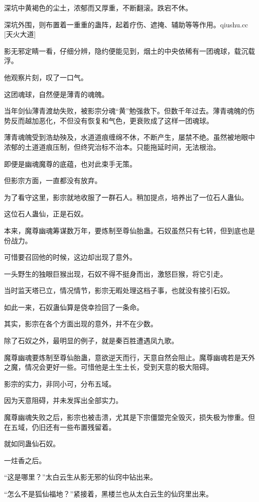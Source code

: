 \begin{this_body}
深坑中黄褐色的尘土，浓郁而又厚重，不断翻滚。跌宕不休。

深坑外围，则布置着一重重的蛊阵，起着疗伤、遮掩、辅助等等作用。qiushu.cc [天火大道]

影无邪定睛一看，仔细分辨，隐约便能见到，烟土的中央依稀有一团魂球，载沉载浮。

他观察片刻，叹了一口气。

这团魂球，自然便是薄青的魂魄。

当年剑仙薄青渡劫失败，被影宗分魂“黄”勉强救下。但数千年过去。薄青魂魄的伤势反而越加恶化，不但没有恢复和气色，更衰败成了这样一团魂球。

薄青魂魄受到浩劫殃及，水道道痕缠绵不休，不断产生，屡禁不绝。虽然被地眼中浓郁的土道道痕压制，但终究治标不治本。只能拖延时间，无法根治。

即便是幽魂魔尊的底蕴，也对此束手无策。

但影宗方面，一直都没有放弃。

为了看守这里，影宗就地收服了一群石人。稍加提点，培养出了一位石人蛊仙。

这位石人蛊仙，正是石奴。

本来，魔尊幽魂筹谋数万年，要炼制至尊仙胎蛊。石奴虽然只有七转，但到底也是份战力。

可惜要召回他的时候，这边却出现了意外。

一头野生的独眼巨猴出现，石奴不得不挺身而出，激怒巨猴，将它引走。

当时监天塔已立，情况情节，影宗无暇处理这档子事，也就没有接引石奴。

如此一来，石奴蛊仙算是侥幸捡回了一条命。

其实，影宗在各个方面出现的意外，并不在少数。

除了石奴之外，最明显的例子，就是秦百胜遭遇凤九歌。

魔尊幽魂要炼制至尊仙胎蛊，意欲逆天而行，天意自然会阻止。魔尊幽魂若是天外之魔，情况会更好一些。可惜他是土生土长，受到天意的极大阻碍。

影宗的实力，非同小可，分布五域。

因为天意阻碍，并未发挥出全部实力。

魔尊幽魂失败之后，影宗也被击溃，尤其是下宗僵盟完全毁灭，损失极为惨重。但在五域，仍旧还有一些布置残留着。

就如同蛊仙石奴。

一炷香之后。

“这是哪里？”太白云生从影无邪的仙窍中钻出来。

“怎么不是狐仙福地？”紧接着，黑楼兰也从太白云生的仙窍里出来。


\end{this_body}

